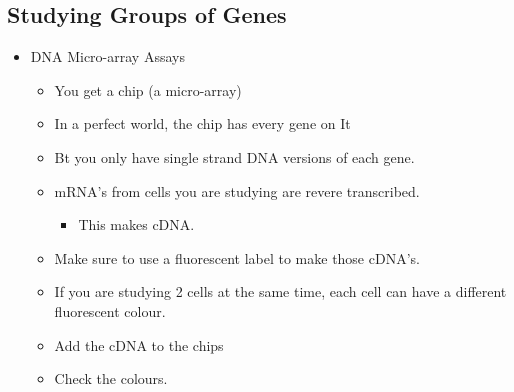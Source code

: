 
\subsection{Studying Groups of Genes}\label{subsec:studying-groups-of-genes}
\begin{itemize}
	\item DNA Micro-array Assays
	\begin{itemize}
		\item You get a chip (a micro-array)
		\item In a perfect world, the chip has every gene on It
		\item Bt you only have single strand DNA versions of each gene.
		\item mRNA's from cells you are studying are revere transcribed.
		\begin{itemize}
			\item This makes cDNA\@.
		\end{itemize}
		\item Make sure to use a fluorescent label to make those cDNA's.
		\item If you are studying 2 cells at the same time, each cell can have a different fluorescent colour.
		\item Add the cDNA to the chips
		\item Check the colours.
	\end{itemize}
\end{itemize}